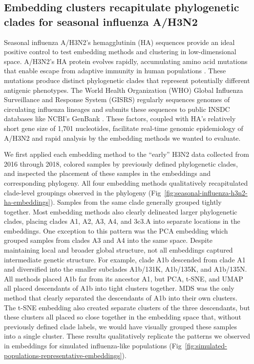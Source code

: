 \documentclass[10pt,letterpaper]{article}
\begin{document}
\subsection*{Embedding clusters recapitulate phylogenetic clades for seasonal influenza A/H3N2}

Seasonal influenza A/H3N2's hemagglutinin (HA) sequences provide an ideal positive control to test embedding methods and clustering in low-dimensional space.
A/H3N2's HA protein evolves rapidly, accumulating amino acid mutations that enable escape from adaptive immunity in human populations \cite{Petrova2018}.
These mutations produce distinct phylogenetic clades that represent potentially different antigenic phenotypes.
The World Health Organization (WHO) Global Influenza Surveillance and Response System (GISRS) regularly sequences genomes of circulating influenza lineages \cite{Hay2018} and submits these sequences to public INSDC databases like NCBI's GenBank \cite{Arita2021}.
These factors, coupled with HA's relatively short gene size of 1,701 nucleotides, facilitate real-time genomic epidemiology of A/H3N2 \cite{Neher2015} and rapid analysis by the embedding methods we wanted to evaluate.

We first applied each embedding method to the ``early'' H3N2 data collected from 2016 through 2018, colored samples by previously defined phylogenetic clades, and inspected the placement of these samples in the embeddings and corresponding phylogeny.
All four embedding methods qualitatively recapitulated clade-level groupings observed in the phylogeny (Fig~\ref{fig:seasonal-influenza-h3n2-ha-embeddings}).
Samples from the same clade generally grouped tightly together.
Most embedding methods also clearly delineated larger phylogenetic clades, placing clades A1, A2, A3, A4, and 3c3.A into separate locations in the embeddings.
One exception to this pattern was the PCA embedding which grouped samples from clades A3 and A4 into the same space.
Despite maintaining local and broader global structure, not all embeddings captured intermediate genetic structure.
For example, clade A1b descended from clade A1 and diversified into the smaller subclades A1b/131K, A1b/135K, and A1b/135N.
All methods placed A1b far from its ancestor A1, but PCA, t-SNE, and UMAP all placed descendants of A1b into tight clusters together.
MDS was the only method that clearly separated the descendants of A1b into their own clusters.
The t-SNE embedding also created separate clusters of the three descendants, but these clusters all placed so close together in the embedding space that, without previously defined clade labels, we would have visually grouped these samples into a single cluster.
These results qualitatively replicate the patterns we observed in embeddings for simulated influenza-like populations (Fig~\ref{fig:simulated-populations-representative-embeddings}).
\end{document}
